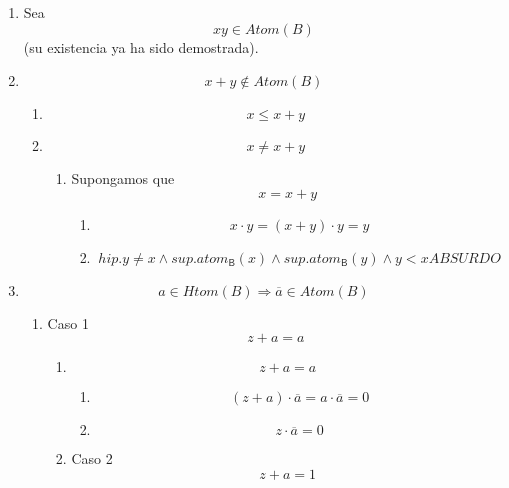 \begin{enumerate}
\begin{enumerate}
\begin{enumerate}
      \begin{enumerate}
      \def\labelenumiv{\arabic{enumiv}.}
      \item
        Sea \[{\mathit{xy} \in \mathit{Atom}}{(B)}\] (su existencia ya
        ha sido demostrada).
      \item
        \[{{x + y} \notin \mathit{Atom}}{(B)}\]

        \begin{enumerate}
        \def\labelenumv{\arabic{enumv}.}
        \item
          \[x \leq {x + y}\]
        \item
          \[x \neq {x + y}\]

          \begin{enumerate}
          \def\labelenumvi{\arabic{enumvi}.}
          \item
            Supongamos que\[x = {x + y}\]

            \begin{enumerate}
            \def\labelenumvii{\arabic{enumvii}.}
            \tightlist
            \item
              \[{{x \cdot y} = {{({x + y})} \cdot y}} = y\]
            \item
              \[\mathit{hip.}{y \neq {x \land \mathit{sup.}}}\mathsf{\mathit{atom}_{B}}{{(x)} \land \mathit{sup.}}\mathsf{\mathit{atom}_{B}}{{{(y)} \land y} < x}\mathit{ABSURDO}\]
            \end{enumerate}
          \end{enumerate}
        \end{enumerate}
      \item
        \[{a \in \mathit{Htom}}{(B)}\Rightarrow{\overline{a} \in \mathit{Atom}}{(B)}\]

        \begin{enumerate}
        \def\labelenumv{\arabic{enumv}.}
        \item
          Caso 1 \[{z + a} = a\]

          \begin{enumerate}
          \def\labelenumvi{\arabic{enumvi}.}
          \item
            \[{z + a} = a\]

            \begin{enumerate}
            \def\labelenumvii{\arabic{enumvii}.}
            \tightlist
            \item
              \[{{{({z + a})} \cdot \overline{a}} = {a \cdot \overline{a}}} = 0\]
            \item
              \[{z \cdot \overline{a}} = 0\]
            \end{enumerate}
          \item
            Caso 2 \[{z + a} = 1\]


\end{enumerate}
\end{enumerate}
\end{enumerate}
\end{enumerate}
\end{enumerate}
\end{enumerate}
